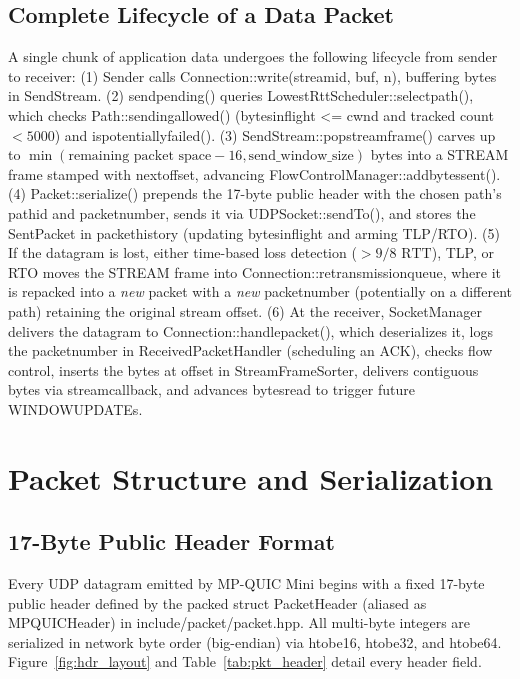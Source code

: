 \documentclass[10pt,a4paper]{article}
\newcommand{\codeul}{\textunderscore\hspace{0pt}}
\DeclareRobustCommand{\code}[1]{{\ttfamily\let\_\codeul #1}}
\begin{document}
\subsection{Complete Lifecycle of a Data Packet}
A single chunk of application data undergoes the following lifecycle from sender to receiver:
(1) Sender calls \code{Connection::write(stream\_id, buf, n)}, buffering bytes in \code{SendStream}.
(2) \code{send\_pending()} queries \code{LowestRttScheduler::select\_path()}, which checks \code{Path::sending\_allowed()} (\code{bytes\_in\_flight <= cwnd} and tracked count $< 5000$) and \code{is\_potentially\_failed()}.
(3) \code{SendStream::pop\_stream\_frame()} carves up to $\min(\text{remaining packet space} - 16, \text{send\_window\_size})$ bytes into a \code{STREAM} frame stamped with \code{next\_offset}, advancing \code{FlowControlManager::add\_bytes\_sent()}.
(4) \code{Packet::serialize()} prepends the 17-byte public header with the chosen path's \code{path\_id} and \code{packet\_number}, sends it via \code{UDPSocket::sendTo()}, and stores the \code{SentPacket} in \code{packet\_history} (updating \code{bytes\_in\_flight} and arming TLP/RTO).
(5) If the datagram is lost, either time-based loss detection ($>9/8\text{ RTT}$), TLP, or RTO moves the \code{STREAM} frame into \code{Connection::retransmission\_queue}, where it is repacked into a \emph{new} packet with a \emph{new} \code{packet\_number} (potentially on a different path) retaining the original stream \code{offset}.
(6) At the receiver, \code{SocketManager} delivers the datagram to \code{Connection::handle\_packet()}, which deserializes it, logs the \code{packet\_number} in \code{ReceivedPacketHandler} (scheduling an ACK), checks flow control, inserts the bytes at \code{offset} in \code{StreamFrameSorter}, delivers contiguous bytes via \code{stream\_callback}, and advances \code{bytes\_read} to trigger future \code{WINDOW\_UPDATE}s.

\section{Packet Structure and Serialization}

\subsection{17-Byte Public Header Format}
Every UDP datagram emitted by MP-QUIC Mini begins with a fixed 17-byte public header defined by the packed struct \code{PacketHeader} (aliased as \code{MPQUICHeader}) in \code{include/packet/packet.hpp}. All multi-byte integers are serialized in network byte order (big-endian) via \code{htobe16}, \code{htobe32}, and \code{htobe64}. Figure~\ref{fig:hdr_layout} and Table~\ref{tab:pkt_header} detail every header field.
\end{document}
